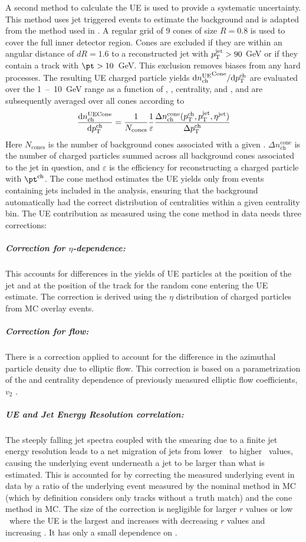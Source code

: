 A second method to calculate the UE is used to provide a systematic uncertainty. This method uses jet triggered events to estimate the background and is adapted from the method used in \cite{PhysRevC.98.024908}. A regular grid of 9 cones of size $R = 0.8$ is used to cover the full inner detector region. Cones are excluded if they are within an angular distance of $dR=1.6$ to a reconstructed jet with $\mbox{$p_{\mathrm{T}}^{\mathrm{jet}}$} > 90$ GeV or if they contain a track with \mbox{$\pt > 10$ GeV}. This exclusion removes biases from any hard processes. The resulting UE charged particle yields $\mathrm{d} \mbox{$n_{\mathrm{ch}}^{\mathrm{UE}}$}^{\mathrm{Cone}}/ \mathrm{d} \mbox{$p_{{\mathrm{T}}}^{\mathrm{ch}}$}$ are evaluated over the \mbox{1 -- 10 GeV} range as a function of \pt, \ptjet, centrality, and \rvar, and are subsequently averaged over all cones according to
 \begin{eqnarray}
 \label{eq:Dptsub}
\frac{\mathrm{d} n_{\mathrm{ch}}^{\mathrm{UE Cone}}}{\mathrm{d} \mbox{$p_{{\mathrm{T}}}^{\mathrm{ch}}$}}  = \frac{1}{N_{\mathrm{cones}}} \frac{1}{\varepsilon} \frac{\Delta n^{\mathrm{cone}}_{\mathrm{ch}} (\mbox{$p_{{\mathrm{T}}}^{\mathrm{ch}}$}, \mbox{$p_{\mathrm{T}}^{\mathrm{jet}}$}, \mbox{$\eta^{\mathrm{jet}}$})}{\Delta \mbox{$p_{{\mathrm{T}}}^{\mathrm{ch}}$}}
 \end{eqnarray}
 Here $N_{\mathrm{cones}}$ is the number of background cones associated with a given \ptjet. $\Delta n^{\mathrm{cone}}_{\mathrm{ch}}$ is the number of charged particles summed across all background cones associated to the jet in question, and $\varepsilon$ is the efficiency for reconstructing a charged particle with $\pt^{\mathrm{ch}}$. The cone method estimates the UE yields only from events containing jets included in the analysis, ensuring that the background automatically had the correct distribution of centralities within a given centrality bin. The UE contribution as measured using the cone method in data needs three corrections:
 \subparagraph{Correction for $\eta$-dependence: } This accounts for differences in the yields of UE particles at the position of the jet and at the position of the track for the random cone entering the UE estimate. The correction is derived using the $\eta$ distribution of charged particles from MC overlay events.
 \subparagraph{Correction for flow: }  There is a correction applied to account for the difference in the azimuthal particle density due to elliptic flow. This correction is based on a parametrization of the \pTch and centrality dependence of previously measured elliptic flow coefficients, $v_{2}$ \cite{2019108}.  
\subparagraph{UE and Jet Energy Resolution correlation: } The steeply falling jet spectra coupled with the smearing due to a finite jet energy resolution leads to a net migration of jets from lower \pt\ to higher \pt\ values, causing the underlying event underneath a jet to be larger than what is estimated. This is accounted for by correcting the measured underlying event in data by a ratio of the underlying event measured by the nominal method in MC (which by definition considers only tracks without a truth match) and the cone method in MC. The size of the correction is negligible for larger $r$ values or low \pttrk\ where the UE is the largest and increases with decreasing $r$ values and increasing \pttrk. It has only a small dependence on \ptjet. 

